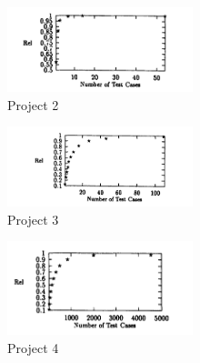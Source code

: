 \documentclass[journal, twoside]{IEEEtran}
\begin{document}
\begin{figure}[ht]
    \centering
    \includegraphics[width=0.48\textwidth, height= 0.2\textwidth]{figure2.PNG}
    \caption{ Project 2}
\end{figure}

\begin{figure}[ht]
    \centering
    \includegraphics[width=0.48\textwidth, height= 0.2\textwidth]{figure3.PNG}
    \caption{ Project 3}
\end{figure}


\begin{figure}[ht]
    \centering
    \includegraphics[width=0.48\textwidth, height= 0.2\textwidth]{figure4.PNG}
    \caption{ Project 4}
\end{figure}
\end{document}
